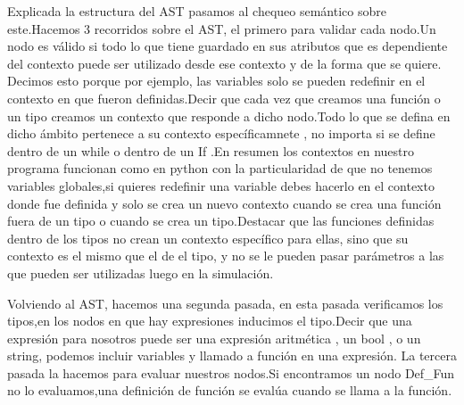 \documentclass[12pt, letterpaper,spanish]{article}
\theoremstyle{definition}
\theoremstyle{remark}
\begin{document}
        Explicada la estructura del AST pasamos al chequeo semántico sobre este.Hacemos 3 recorridos sobre el AST, el primero para validar cada nodo.Un nodo
        es válido si todo lo que tiene guardado en sus atributos que es dependiente del contexto puede ser utilizado desde ese contexto y de la forma que se quiere.
        Decimos esto porque por ejemplo, las variables solo se pueden redefinir en el contexto en que fueron definidas.Decir que cada vez que creamos una función o un 
        tipo creamos un contexto que responde a dicho nodo.Todo lo que se defina en dicho ámbito pertenece a su contexto específicamnete , no importa si se define dentro de un
        while o dentro de un If .En resumen los contextos en nuestro programa funcionan como en python con la particularidad de que no tenemos variables globales,si
        quieres redefinir una variable debes hacerlo en el contexto donde fue definida y solo se crea un nuevo contexto cuando se crea una función fuera de un tipo 
        o cuando se crea un tipo.Destacar que las funciones definidas dentro de los tipos no crean un contexto específico para ellas, sino que su 
        contexto es el mismo que el de el tipo, y no se le pueden pasar parámetros a las que pueden ser utilizadas luego en la simulación.

        Volviendo al AST, hacemos una segunda pasada, en esta pasada verificamos los tipos,en los nodos en que hay expresiones inducimos el tipo.Decir que 
        una expresión para nosotros puede ser una expresión aritmética , un bool , o un string, podemos incluir variables y llamado a función en una expresión. La tercera pasada
        la hacemos para evaluar nuestros nodos.Si encontramos un nodo Def_Fun no lo evaluamos,una definición de función se evalúa cuando se llama a la función.
\end{document}
